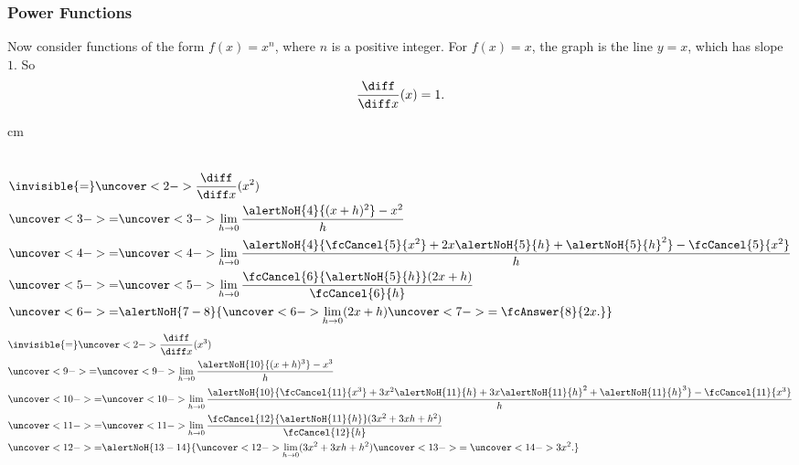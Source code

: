\begin{frame}
\frametitle{Power Functions}
Now consider functions of the form $f(x) = x^n$, where $n$ is a positive integer.  For $f(x) = x$, the graph is the line $y = x$, which has slope $1$.  So
\[
\frac{\diff}{\diff x} (x) = 1.
\]

%
 cm
\begin{columns}[t]
\abovedisplayskip=0pt
\belowdisplayskip=0pt
\begin{align*}
& \invisible{ = } \uncover<2->{\frac{\diff}{\diff x} (x^2)}\\
& \uncover<3->{ = }  %
\uncover<3->{\lim_{h\rightarrow 0}\frac{\alertNoH{ 4}{(x+h)^2} - x^2}{h}}\\
& \uncover<4->{ = }  %
\uncover<4->{\lim_{h\rightarrow 0}\frac{\alertNoH{ 4}{ \fcCancel{ 5}{x^2} + 2x\alertNoH{5}{h} + {\alertNoH{5}{h}}^2}  -\fcCancel{ 5}{ x^2}}{h}}\\
& \uncover<5->{ = }  %
\uncover<5->{\lim_{h\rightarrow 0}\frac{\fcCancel{6}{ \alertNoH{5}{h}}(2x + h)}{\fcCancel{6}{h}}}\\
& \uncover<6->{ = }  %
\alertNoH{ 7-8}{\uncover<6->{\lim_{h\rightarrow 0}(2x + h)}\uncover<7->{ = \fcAnswer{8}{2x.}}}
\end{align*}
\abovedisplayskip=0pt
\belowdisplayskip=0pt
\begin{align*}
& \invisible{ = } \uncover<2->{\frac{\diff}{\diff x} (x^3)}\\
& \uncover<9->{ = }  %
\uncover<9->{\lim_{h\rightarrow 0}\frac{\alertNoH{ 10}{(x+h)^3} - x^3}{h}}\\
& \uncover<10->{ = }  %
\uncover<10->{\lim_{h\rightarrow 0}\frac{\alertNoH{ 10}{\fcCancel{ 11}{x^3} + 3x^2\alertNoH{11}{ h} + 3x{\alertNoH{11}{h}}^2 + {\alertNoH{11}{h}}^3}  - \fcCancel{ 11}{x^3}}{h}}\\
& \uncover<11->{ = }  %
\uncover<11->{\lim_{h\rightarrow 0}\frac{\fcCancel{12}{\alertNoH{11}{h}}(3x^2 + 3xh + h^2)}{\fcCancel{12}{h}}}\\
& \uncover<12->{ = }  %
\alertNoH{ 13-14}{\uncover<12->{\lim_{h\rightarrow 0}(3x^2 + 3xh + h^2)}\uncover<13->{ = \uncover<14->{3x^2.}}}
\end{align*}
\end{columns}
\end{frame}
